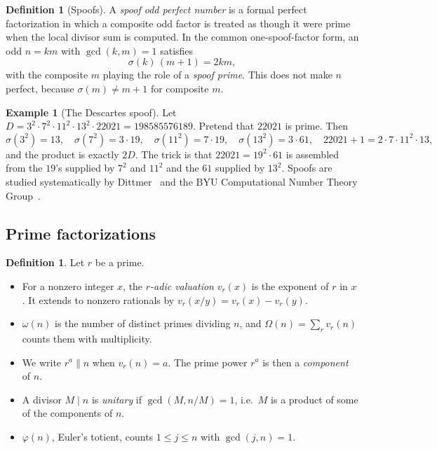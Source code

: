 \documentclass[11pt]{article}
\theoremstyle{definition}
\newtheorem{definition}[theorem]{Definition}
\newtheorem{example}[theorem]{Example}
\theoremstyle{remark}
\begin{document}
\begin{definition}[Spoofs]
A \emph{spoof odd perfect number} is a formal perfect factorization in which
a composite odd factor is treated as though it were prime when the local
divisor sum is computed.  In the common one-spoof-factor form, an odd
$n=km$ with $\gcd(k,m)=1$ satisfies
\[
\sigma(k)\,(m+1)=2km,
\]
with the composite $m$ playing the role of a \emph{spoof prime}.  This does
not make $n$ perfect, because $\sigma(m)\ne m+1$ for composite $m$.
\end{definition}

\begin{example}[The Descartes spoof]\label{ex:descartes}
Let $D=3^2\cdot7^2\cdot11^2\cdot13^2\cdot 22021=198585576189$.  Pretend
that $22021$ is prime.  Then
\[
\sigma(3^2)=13,\quad
\sigma(7^2)=3\cdot19,\quad
\sigma(11^2)=7\cdot19,\quad
\sigma(13^2)=3\cdot61,\quad
22021+1=2\cdot7\cdot11^2\cdot13,
\]
and the product is exactly $2D$.  The trick is that
$22021=19^2\cdot 61$ is assembled from the $19$'s supplied by $7^2$ and
$11^2$ and the $61$ supplied by $13^2$.  Spoofs are studied systematically
by Dittmer~\cite{Dittmer} and the BYU Computational Number Theory
Group~\cite{BYU2022}.
\end{example}

\subsection{Prime factorizations}\label{sec:factorizations}

\begin{definition}
Let $r$ be a prime.
\begin{itemize}[leftmargin=1.5em]
\item For a nonzero integer $x$, the \emph{$r$-adic valuation} $v_r(x)$ is the
  exponent of $r$ in $x$.  It extends to nonzero rationals by
  $v_r(x/y)=v_r(x)-v_r(y)$.
\item $\omega(n)$ is the number of distinct primes dividing $n$, and
  $\Omega(n)=\sum_r v_r(n)$ counts them with multiplicity.
\item We write $r^a\parallel n$ when $v_r(n)=a$.  The prime power $r^a$ is
  then a \emph{component} of $n$.
\item A divisor $M\mid n$ is \emph{unitary} if $\gcd(M,n/M)=1$, i.e.\ $M$ is
  a product of some of the components of $n$.
\item $\varphi(n)$, Euler's totient, counts $1\le j\le n$ with
  $\gcd(j,n)=1$.
\end{itemize}
\end{definition}
\end{document}
